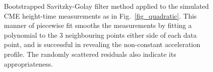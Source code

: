 \documentclass[structabstract]{aa}
\begin{document}
\begin{figure}[t]
\centering
{}
\caption{Bootstrapped Savitzky-Golay filter method applied to the simulated CME height-time measurements as in Fig.~\ref{fig_quadratic}. This manner of piecewise fit smooths the measurements by fitting a polynomial to the 3 neighbouring points either side of each data point, and is successful in revealing the non-constant acceleration profile. The randomly scattered residuals also indicate its appropriateness.}
\label{fig_savgol}
\end{figure}
\end{document}

